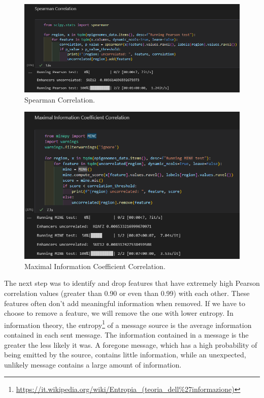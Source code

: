 \documentclass{article}
\begin{document}
\begin{figure}[!ht]
    \centering
    \includegraphics[width=12cm]{image/Spearman.PNG}
    \caption{Spearman Correlation.}
    \label{fig:Spearman}
\end{figure}

\begin{figure}[!ht]
    \centering
    \includegraphics[width=12cm]{image/MIC.PNG}
    \caption{Maximal Information Coefficient Correlation.}
    \label{fig:MIC}
\end{figure}

\noindent
The next step was to identify and drop features that have extremely high Pearson correlation values (greater than 0.90 or even than 0.99) with each other. These features often don't add meaningful information when removed. If we have to choose to remove a feature, we will remove the one with lower entropy. In information theory, the entropy\footnote{\url{https://it.wikipedia.org/wiki/Entropia_(teoria_dell\%27informazione)}} of a message source is the average information contained in each sent message. The information contained in a message is the greater the less likely it was. A foregone message, which has a high probability of being emitted by the source, contains little information, while an unexpected, unlikely message contains a large amount of information.
\end{document}
